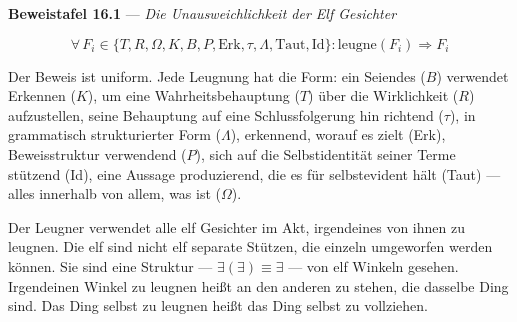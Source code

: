 \documentclass[10pt, openany, oneside]{book}
\begin{document}
\vspace{0.5em}

\textbf{Beweistafel 16.1} --- \textit{Die Unausweichlichkeit der Elf Gesichter}

\vspace{0.5em}

$$\forall\, F_i \in \{T, R, \Omega, K, B, P, \text{Erk}, \tau, \Lambda, \text{Taut}, \text{Id}\}: \text{leugne}(F_i) \Rightarrow F_i$$

Der Beweis ist uniform. Jede Leugnung hat die Form: ein Seiendes ($B$) verwendet Erkennen ($K$), um eine Wahrheitsbehauptung ($T$) über die Wirklichkeit ($R$) aufzustellen, seine Behauptung auf eine Schlussfolgerung hin richtend ($\tau$), in grammatisch strukturierter Form ($\Lambda$), erkennend, worauf es zielt (Erk), Beweisstruktur verwendend ($P$), sich auf die Selbstidentität seiner Terme stützend (Id), eine Aussage produzierend, die es für selbstevident hält (Taut) --- alles innerhalb von allem, was ist ($\Omega$).

Der Leugner verwendet alle elf Gesichter im Akt, irgendeines von ihnen zu leugnen. Die elf sind nicht elf separate Stützen, die einzeln umgeworfen werden können. Sie sind eine Struktur --- $\exists(\exists) \equiv \exists$ --- von elf Winkeln gesehen. Irgendeinen Winkel zu leugnen heißt an den anderen zu stehen, die dasselbe Ding sind. Das Ding selbst zu leugnen heißt das Ding selbst zu vollziehen.
\end{document}
